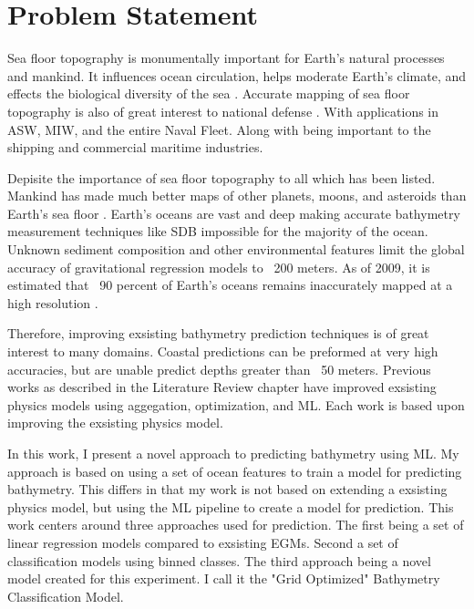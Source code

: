 \section{Problem Statement}
\setlength{\parindent}{10ex}

Sea floor topography is monumentally important for Earth's natural processes and mankind.
It influences ocean circulation, helps moderate Earth's climate, and effects the biological diversity of the sea \cite{kunze2004role}.
Accurate mapping of sea floor topography is also of great interest to national defense \cite{goodman1982defence}.
With applications in \ac{ASW}, \ac{MIW}, and the entire Naval Fleet.
Along with being important to the shipping and commercial maritime industries.

\par
Depisite the importance of sea floor topography to all which has been listed.
Mankind has made much better maps of other planets, moons, and asteroids than Earth's sea floor \cite{becker2009global}.
Earth's oceans are vast and deep making accurate bathymetry measurement techniques like \ac{SDB} impossible for the majority of the ocean.
Unknown sediment composition and other environmental features limit the global accuracy of gravitational regression models to ~200 meters.
As of 2009, it is estimated that ~90 percent of Earth's oceans remains inaccurately mapped at a high resolution \cite{becker2009global}.

\par
Therefore, improving exsisting bathymetry prediction techniques is of great interest to many domains.
Coastal predictions can be preformed at very high accuracies, but are unable predict depths greater than ~50 meters.
Previous works as described in the Literature Review chapter have improved exsisting physics models using aggegation, optimization, and \ac{ML}.
Each work is based upon improving the exsisting physics model.

\par
In this work, I present a novel approach to predicting bathymetry using \ac{ML}.
My approach is based on using a set of ocean features to train a model for predicting bathymetry.
This differs in that my work is not based on extending a exsisting physics model, but using the \ac{ML} pipeline to create a model for prediction.
This work centers around three approaches used for prediction.
The first being a set of linear regression models compared to exsisting \ac{EGM}s.
Second a set of classification models using binned classes.
The third approach being a novel model created for this experiment.
I call it the "Grid Optimized" Bathymetry Classification Model.